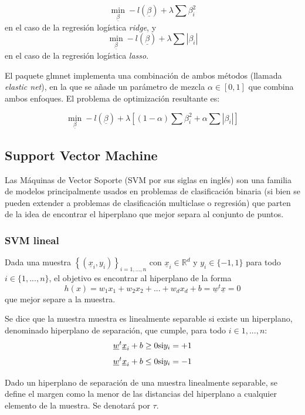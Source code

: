 \documentclass[12pt,a4paper,]{book}
\numberwithin{dummy}{section}
\theoremstyle{ocrenumbox}
\theoremstyle{blacknumex}
\theoremstyle{blacknumbox}
\theoremstyle{ocrenum}
\theoremstyle{ocrenum}
\begin{document}
\[\min_{\underline \beta} -l(\underline \beta)  + \lambda \sum \beta_i^2 \]
en el caso de la regresión logística \emph{ridge}, y
\[\min_{\underline \beta} -l(\underline \beta)  + \lambda \sum |\beta_i|\]
en el caso de la regresión logística \emph{lasso}.

El paquete glmnet implementa una combinación de ambos métodos (llamada
\emph{elastic net}), en la que se añade un parámetro de mezcla
\(\alpha \in \left[0,1\right]\) que combina ambos enfoques. El problema
de optimización resultante es:

\[\min_{\underline \beta} -l(\underline \beta)  + \lambda \left[(1-\alpha)\sum \beta_i^2 + \alpha \sum |\beta_i| \right]\]

\hypertarget{support-vector-machine}{%
\subsection{Support Vector Machine}\label{support-vector-machine}}

Las Máquinas de Vector Soporte (SVM por sus siglas en inglés) son una
familia de modelos principalmente usados en problemas de clasificación
binaria (si bien se pueden extender a problemas de clasificación
multiclase o regresión) que parten de la idea de encontrar el hiperplano
que mejor separa al conjunto de puntos.

\hypertarget{svm-lineal}{%
\subsubsection{SVM lineal}\label{svm-lineal}}

Dada una muestra \(\left\{(\underline x_i,y_i) \right\}_{i=1,...,n}\)
con \(\underline x_i \in \mathbb{R}^d\) y \(y_i \in \{-1,1\}\) para todo
\(i \in \{1,...,n\}\), el objetivo es encontrar al hiperplano de la
forma
\[h(x) = w_1x_1 +w_2x_2+...+w_dx_d +b = \underline w^t \underline x = 0 \]
que mejor separe a la muestra.

Se dice que la muestra muestra es linealmente separable si existe un
hiperplano, denominado hiperplano de separación, que cumple, para todo
\(i \in 1,...,n\):
\[\underline w^t \underline x_i + b \ge 0 \space \space \text{si} \space \space y_i=+1\]
\[\underline w^t \underline x_i + b \le 0 \space \space \text{si} \space \space y_i=-1\]

Dado un hiperplano de separación de una muestra linealmente separable,
se define el margen como la menor de las distancias del hiperplano a
cualquier elemento de la muestra. Se denotará por \(\tau\).
\end{document}
